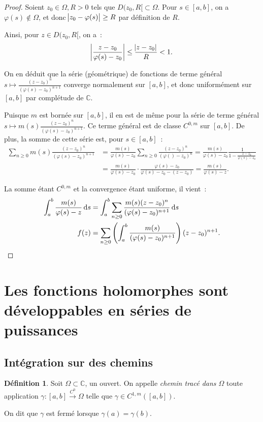 \documentclass{report}
\theoremstyle{definition}
\newtheorem{déf}[thm]{Définition}
\theoremstyle{remark}
\numberwithin{equation}{section}
\newcommand{\C}{\mathbb C}
\newcommand{\toC}[1]{\xrightarrow{C^{#1}}}
\newcommand{\tocont}{\toC 0}
\begin{document}
			\begin{proof} Soient $z_0 \in \Omega, R > 0$ tels que $D(z_0, R[ \subset \Omega$. Pour $s \in [a, b]$, on a $\varphi(s) \not \in \Omega$, et donc
			$\abs {z_0-\varphi(s)} \geq R$ par définition de $R$.

			Ainsi, pour $z \in D(z_0, R[$, on a~:
			\begin{equation}
				\abs {\frac {z-z_0}{\varphi(s)-z_0}} \leq \frac {\abs {z-z_0}}R < 1.
			\end{equation}

			On en déduit que la série (géométrique) de fonctions de terme général $s \mapsto \frac {(z-z_0)^n}{(\varphi(s) - z_0)^{n+1}}$ converge normalement
			sur $[a, b]$, et donc uniformément sur $[a, b]$ par complétude de $\C$.

			Puisque $m$ est bornée sur $[a, b]$, il en est de même pour la série de terme général $s \mapsto m(s)\frac {(z-z_0)^n}{(\varphi(s) - z_0)^{n+1}}$.
			Ce terme général est de classe $C^{0, m}$ sur $[a, b]$. De plus, la somme de cette série est, pour $s \in [a, b]$~:
			\begin{align}
				\sum_{n \geq 0}m(s)\frac {(z-z_0)^n}{(\varphi(s)-z_0)^{n+1}} &= \frac {m(s)}{\varphi(s)-z_0}\sum_{n \geq 0}\frac {(z-z_0)^n}{(\varphi()-z_0)^n}
					= \frac {m(s)}{\varphi(s)-z_0}\frac 1{1-\frac {z-z_0}{\varphi(s)-z_0}} \\
				&= \frac {m(s)}{\varphi(s)-z_0} \cdot \frac {\varphi(s)-z_0}{\varphi(s) - z_0 - (z-z_0)} = \frac {m(s)}{\varphi(s)-z}.
			\end{align}

			La somme étant $C^{0,m}$ et la convergence étant uniforme, il vient~:
			\begin{align}
				\int_a^b\frac {m(s)}{\varphi(s)-z}\dif s &= \int_a^b\sum_{n \geq 0}\frac {m(s)(z-z_0)^n}{(\varphi(s) - z_0)^{n+1}}\dif s \\
				f(z) &= \sum_{n \geq 0}\left(\int_a^b\frac {m(s)}{(\varphi(s)-z_0)^{n+1}}\right)(z-z_0)^{n+1}.
			\end{align}
			\end{proof}

	\section{Les fonctions holomorphes sont développables en séries de puissances}
		\subsection{Intégration sur des chemins}
			\begin{déf} Soit $\Omega \subset \C$, un ouvert. On appelle \textit{chemin tracé dans $\Omega$} toute application $\gamma : [a, b] \tocont \Omega$
			telle que $\gamma \in C^{1,m}([a, b])$.

			On dit que $\gamma$ est fermé lorsque $\gamma(a) = \gamma(b)$.
			\end{déf}
\end{document}
